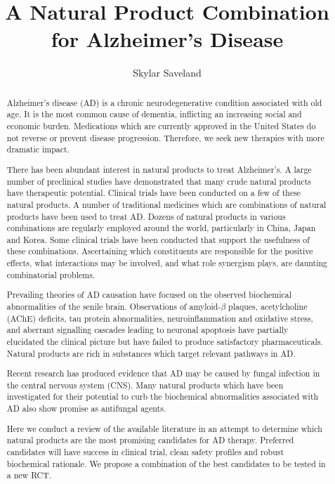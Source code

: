 \documentclass[twocolumn]{article}
\begin{document}
\onecolumn
\title{A Natural Product Combination for Alzheimer's Disease}
\author{Skylar Saveland}

\maketitle

\begin{abstract}


Alzheimer's disease (AD) is a chronic neurodegenerative condition
associated with old age. It is the most common cause of dementia,
inflicting an increasing social and economic burden.
Medications which are currently approved in the United States
do not reverse or prevent disease progression.
Therefore, we seek new therapies with more dramatic impact.

There has been abundant interest in natural products to treat Alzheimer's.
A large number of preclinical studies have demonstrated
that many crude natural products have therapeutic potential.
Clinical trials have been conducted on a few of these natural products.
A number of traditional medicines which are combinations of natural products
have been used to treat AD.
Dozens of natural products in various combinations are regularly employed
around the world, particularly in China, Japan and Korea.
Some clinical trials
have been conducted that support the usefulness of these combinations.
Ascertaining which constituents are responsible for the positive effects,
what interactions may be involved,
and what role synergism plays, are daunting combinatorial problems.

Prevailing theories of AD causation have focused on the observed
biochemical abnormalities of the senile brain.
Observations of amyloid-$\beta$ plaques, acetylcholine (AChE) deficits,
tau protein abnormalities,
neuroinflammation and oxidative stress,
and aberrant signalling cascades leading to neuronal apoptosis
have partially elucidated the clinical picture
but have failed to produce satisfactory pharmaceuticals.
Natural products are rich in substances which target
relevant pathways in AD.

Recent research has produced evidence
that AD may be caused by fungal infection in the central nervous system (CNS).
Many natural products which have been investigated for their potential
to curb the biochemical abnormalities associated with AD
also show promise as antifungal agents.

Here we conduct a review of the available literature in an attempt
to determine which natural products are the most promising
candidates for AD therapy.
Preferred candidates will have
success in clinical trial,
clean safety profiles
and robust biochemical rationale.
We propose a combination of the best candidates to be tested in a new RCT.
\end{abstract}
\tableofcontents
\twocolumn
\end{document}
